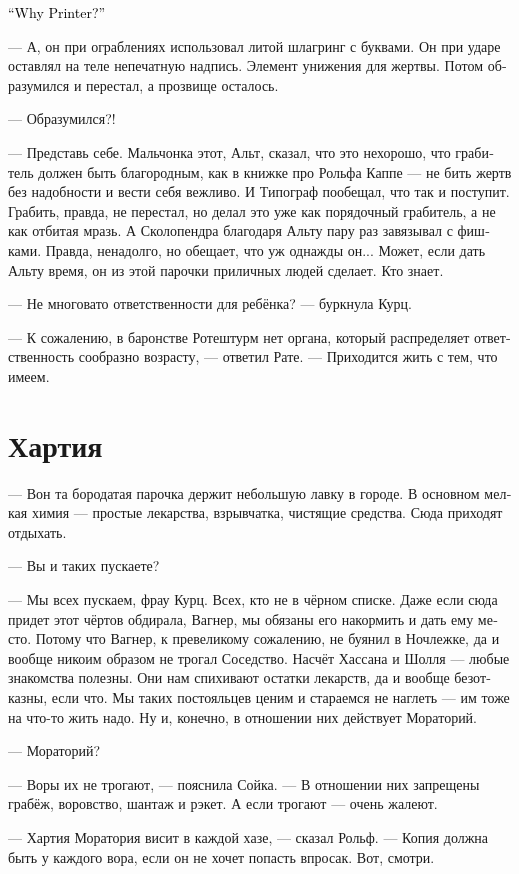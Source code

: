 \documentclass[a4paper,12pt,fleqn]{book}\usepackage{cooltooltips}\usepackage{polyglossia}\setdefaultlanguage[babelshorthands=true]{russian}\setotherlanguage{english}\defaultfontfeatures{Ligatures=TeX,Mapping=tex-text} \usepackage{xcolor}\definecolor{lightgray}{HTML}{bbbbbb}\color{lightgray}\newcommand{\ml}[3]{\textenglish{\textcolor{black}{#3}}}
\begin{document}
\ml{$0$}
{--- А почему Типограф?}
{``Why Printer?''}

--- А, он при ограблениях использовал литой шлагринг с буквами.
Он при ударе оставлял на теле непечатную надпись.
Элемент унижения для жертвы.
Потом образумился и перестал, а прозвище осталось.

--- Образумился?!

--- Представь себе.
Мальчонка этот, Альт, сказал, что это нехорошо, что грабитель должен быть благородным, как в книжке про Рольфа Каппе --- не бить жертв без надобности и вести себя вежливо.
И Типограф пообещал, что так и поступит.
Грабить, правда, не перестал, но делал это уже как порядочный грабитель, а не как отбитая мразь.
А Сколопендра благодаря Альту пару раз завязывал с фишками.
Правда, ненадолго, но обещает, что уж однажды он...
Может, если дать Альту время, он из этой парочки приличных людей сделает.
Кто знает.

--- Не многовато ответственности для ребёнка? --- буркнула Курц.

--- К сожалению, в баронстве Ротештурм нет органа, который распределяет ответственность сообразно возрасту, --- ответил Рате.
--- Приходится жить с тем, что имеем.

\section{Хартия}

--- Вон та бородатая парочка держит небольшую лавку в городе.
В основном мелкая химия --- простые лекарства, взрывчатка, чистящие средства.
Сюда приходят отдыхать.

--- Вы и таких пускаете?

--- Мы всех пускаем, фрау Курц.
Всех, кто не в чёрном списке.
Даже если сюда придет этот чёртов обдирала, Вагнер, мы обязаны его накормить и дать ему место.
Потому что Вагнер, к превеликому сожалению, не буянил в Ночлежке, да и вообще никоим образом не трогал Соседство.
Насчёт Хассана и Шолля --- любые знакомства полезны. 
Они нам спихивают остатки лекарств, да и вообще безотказны, если что.
Мы таких постояльцев ценим и стараемся не наглеть --- им тоже на что-то жить надо.
Ну и, конечно, в отношении них действует Мораторий.

--- Мораторий?

--- Воры их не трогают, --- пояснила Сойка.
--- В отношении них запрещены грабёж, воровство, шантаж и рэкет.
А если трогают --- очень жалеют.

--- Хартия Моратория висит в каждой хазе, --- сказал Рольф.
--- Копия должна быть у каждого вора, если он не хочет попасть впросак.
Вот, смотри.
\end{document}
